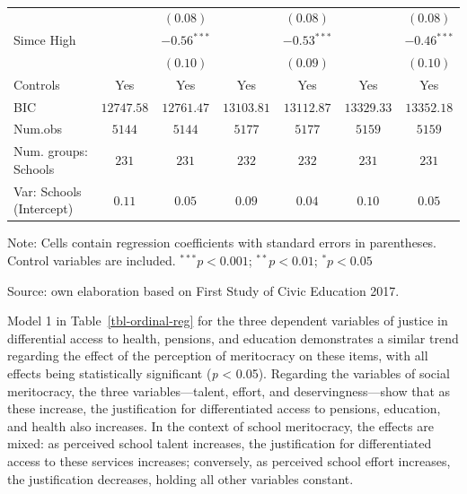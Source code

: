 \documentclass[
    behavsci,
    article,
    submit,
moreauthors
]{mdpi}
\begin{document}
\begin{table}
{\begin{center}
{\begin{threeparttable}
\begin{tabular}{l c c c c c c}
                                          &               & $(0.08)$      &               & $(0.08)$      &               & $(0.08)$      \\
\quad Simce High                          &               & $-0.56^{***}$ &               & $-0.53^{***}$ &               & $-0.46^{***}$ \\
                                          &               & $(0.10)$      &               & $(0.09)$      &               & $(0.10)$      \\
\midrule
Controls                                  & Yes           & Yes           & Yes           & Yes           & Yes           & Yes           \\
BIC                                       & $12747.58$    & $12761.47$    & $13103.81$    & $13112.87$    & $13329.33$    & $13352.18$    \\
Num.obs                                   & $5144$        & $5144$        & $5177$        & $5177$        & $5159$        & $5159$        \\
Num. groups: Schools                      & $231$         & $231$         & $232$         & $232$         & $231$         & $231$         \\
Var: Schools (Intercept)                  & $0.11$        & $0.05$        & $0.09$        & $0.04$        & $0.10$        & $0.05$        \\
\bottomrule
\end{tabular}
\begin{tablenotes}[flushleft]
\scriptsize{\item Note: Cells contain regression coefficients with standard errors in parentheses. Control variables are included. $^{***}p<0.001$; $^{**}p<0.01$; $^{*}p<0.05$ \\ \item Source: own elaboration based on First Study of Civic Education 2017.}
\end{tablenotes}
\end{threeparttable}
}
\caption{}
\label{table:coefficients}
\end{center}

}

\end{table}%

Model 1 in Table~\ref{tbl-ordinal-reg} for the three dependent variables
of justice in differential access to health, pensions, and education
demonstrates a similar trend regarding the effect of the perception of
meritocracy on these items, with all effects being statistically
significant (\emph{p} \textless{} 0.05). Regarding the variables of
social meritocracy, the three variables---talent, effort, and
deservingness---show that as these increase, the justification for
differentiated access to pensions, education, and health also increases.
In the context of school meritocracy, the effects are mixed: as
perceived school talent increases, the justification for differentiated
access to these services increases; conversely, as perceived school
effort increases, the justification decreases, holding all other
variables constant.
\end{document}
